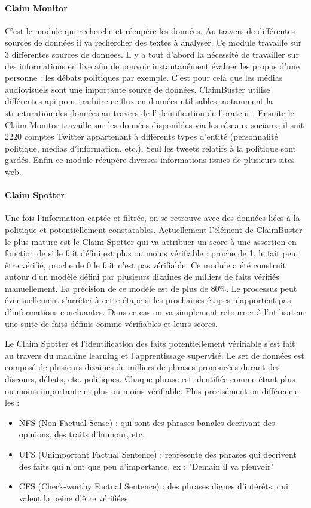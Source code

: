 \paragraph{Claim Monitor}

C'est le module qui recherche et récupère les données. Au travers de différentes sources de données il va rechercher des textes à analyser. Ce module travaille sur 3 différentes sources de données. Il y a tout d'abord la nécessité de travailler sur des informations en live afin de pouvoir instantanément évaluer les propos d'une personne : les débats politiques par exemple. C'est pour cela que les médias audiovisuels sont une importante source de données. ClaimBuster utilise différentes api pour traduire ce flux en données utilisables, notamment la structuration des données au travers de l'identification de l'orateur \cite{joseph2015speaker}. Ensuite le Claim Monitor travaille sur les données disponibles via les réseaux sociaux, il suit 2220 comptes Twitter appartenant à différents types d'entité (personnalité politique, médias d'information, etc.). Seul les tweets relatifs à la politique sont gardés. Enfin ce module récupère diverses informations issues de plusieurs sites web.

\paragraph{Claim Spotter}

Une fois l'information captée et filtrée, on se retrouve avec des données liées à la politique et potentiellement constatables. Actuellement l'élément de ClaimBuster le plus mature est le Claim Spotter qui va attribuer un score à une assertion en fonction de si le fait défini est plus ou moins vérifiable : proche de 1, le fait peut être vérifié, proche de 0 le fait n'est pas vérifiable. Ce module a été construit autour d'un modèle défini par plusieurs dizaines de milliers de faits vérifiés manuellement. La précision de ce modèle est de plus de 80\%. Le processus peut éventuellement s'arrêter à cette étape si les prochaines étapes n'apportent pas d'informations concluantes. Dans ce cas on va simplement retourner à l'utilisateur une suite de faits définis comme vérifiables et leurs scores.

Le Claim Spotter et l'identification des faits potentiellement vérifiable s'est fait au travers du machine learning et l'apprentissage supervisé. Le set de données est composé de plusieurs dizaines de milliers de phrases prononcées durant des discours, débats, etc. politiques. Chaque phrase est identifiée comme étant plus ou moins importante et plus ou moins vérifiable. Plus précisément on différencie les : 
\begin{itemize}
    \item NFS (Non Factual Sense) : qui sont des phrases banales décrivant des opinions, des traits d'humour, etc. 
    \item UFS (Unimportant Factual Sentence) : représente des phrases qui décrivent des faits qui n'ont que peu d'importance, ex : "Demain il va pleuvoir"
    \item CFS (Check-worthy Factual Sentence) : des phrases dignes d'intérêts, qui valent la peine d'être vérifiées. 
\end{itemize}

